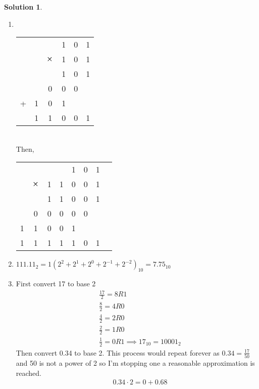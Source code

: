 \documentclass[10pt]{article}
\theoremstyle{definition}
\newtheorem{soln}{Solution}
\begin{document}
\begin{soln}
\begin{enumerate}[label=(\alph*)]
    \item ~\\
          \begin{tabular}{cccccc}
            ~ & ~ & ~        & 1 & 0 & 1 \\
            ~ & ~ & $\cross$ & 1 & 0 & 1 \\
            \hline
            ~ & ~ & ~        & 1 & 0 & 1 \\
            ~ & ~ & 0        & 0 & 0 & ~ \\
            + & 1 & 0        & 1 & ~ & ~ \\
            \hline
            ~ & 1 & 1        & 0 & 0 & 1
          \end{tabular} ~\\
          Then, \\
          \begin{tabular}{cccccccc}
            ~ & ~        & ~ & ~ & 1 & 0 & 1 \\
            ~ & $\cross$ & 1 & 1 & 0 & 0 & 1 \\
            \hline
            ~ & ~        & 1 & 1 & 0 & 0 & 1 \\
            ~ & 0        & 0 & 0 & 0 & 0     \\
            1 & 1        & 0 & 0 & 1         \\
            \hline
            1 & 1        & 1 & 1 & 1 & 0 & 1
          \end{tabular}
    \item $111.11_2=1\left(2^2+2^1+2^0+2^{-1}+2^{-2}\right)_{10}=7.75_{10}$
    \item First convert 17 to base 2
          \begin{align*}
             & \frac{17}{2}=8R1                         \\
             & \frac{8}{2}=4R0                          \\
             & \frac{4}{2}=2R0                          \\
             & \frac{2}{2}=1R0                          \\
             & \frac{1}{2}=0R1 \implies 17_{10}=10001_2
          \end{align*}
          Then convert 0.34 to base 2. This process would repeat forever as $0.34=\frac{17}{50}$ and 50 is not a power of 2 so I'm stopping one a reasonable approximation is reached.
          \begin{align*}
             & 0.34\cdot 2 = 0+0.68                                     \\

\end{align*}
\end{enumerate}
\end{soln}
\end{document}
